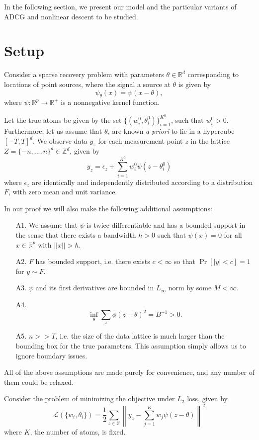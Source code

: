 \documentclass[11pt]{article}
\begin{document}
In the following section, we present our model and the particular
variants of ADCG and nonlinear descent to be studied.

\section{Setup}\label{section:Setup}

Consider a sparse recovery problem with parameters $\theta \in
\mathbb{R}^d$ corresponding to locations of point sources, where the
signal a source at $\theta$ is given by
\[
\psi_\theta(x) = \psi(x - \theta),
\]
where $\psi: \mathbb{R}^p \to \mathbb{R}^+$ is a nonnegative kernel
function.  

Let the true atoms be given by the set $\{(w_i^0,
\theta_i^0)\}_{i=1}^{K^0}$, such that $w_i^0 > 0$.  Furthermore, let
us assume that $\theta_i$ are known \emph{a priori} to lie in a
hypercube $[-T, T]^d$.  We observe data $y_z$ for each measurement
point $z$ in the lattice $Z = \{-n,..., n\}^d \in \mathbb{Z}^d$, given by
\[
y_z = \epsilon_z + \sum_{i=1}^{K^0} w_i^0 \psi(z - \theta_i^0)
\]
where $\epsilon_z$ are identically and independently distributed
according to a distribution $F$, with zero mean and unit variance.

In our proof we will also make the following additional assumptions:
\begin{itemize}
\item[A1.] We assume that $\psi$ is twice-differentiable and has a
bounded support in the sense that there exists a bandwidth $h > 0$
such that $\psi(x) = 0$ for all $x \in \mathbb{R}^p$ with $||x|| > h$.
\item[A2.] $F$ has bounded support, i.e. there exists $c < \infty$ so that $\Pr[|y| < c] = 1$ for $y \sim F$.
\item[A3.] $\psi$ and its first derivatives are bounded in $L_\infty$ norm by some $M < \infty$.
\item[A4.] \[
\inf_\theta \sum_z \phi(z - \theta)^2  = B^{-1} > 0.
\]
\item[A5.] $n >> T$, i.e. the size of the data lattice is much larger than
  the bounding box for the true parameters.  This assumption simply
  allows us to ignore boundary issues.
\end{itemize}
All of the above assumptions are made purely for convenience, and any
number of them could be relaxed.

Consider the problem of minimizing the objective under $L_2$ loss, given by
\[
\mathcal{L}(\{w_i, \theta_i\}) = \frac{1}{2}\sum_{z \in Z} \left\|y_z - \sum_{j=1}^K w_j \psi(z - \theta) \right\|^2
\]
where $K$, the number of atoms, is fixed.
\end{document}

